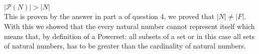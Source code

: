 \documentclass[letterpaper]{article}
\begin{document}
		\subsection{}
      		$|\mathcal{P}(N)| > |N|$ \\
            This is proven by the answer in part a of question 4, we proved that $|N| \neq |F|$.  With this we showed that the every natural number cannot
            represent itself which means that, by definition of a Powerset: all subsets of a set or in this case all sets of natural numbers, has to be greater 			than the cardinality of natural numbers.  
\end{document}
